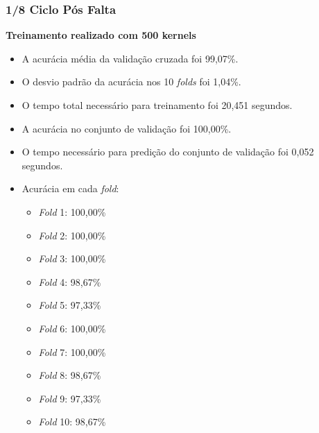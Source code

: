 \subsubsection{1/8 Ciclo Pós Falta}
\textbf{Treinamento realizado com 500 kernels}
\begin{itemize}
    \item A acurácia média da validação cruzada foi 99,07\%.
    \item O desvio padrão da acurácia nos 10 \textit{folds} foi 1,04\%.
    \item O tempo total necessário para treinamento foi 20,451 segundos.
    \item A acurácia no conjunto de validação foi 100,00\%.
    \item O tempo necessário para predição do conjunto de validação foi 0,052 segundos.
    \item Acurácia em cada \textit{fold}:
    \begin{itemize}
        \item \textit{Fold} 1: 100,00\%
        \item \textit{Fold} 2: 100,00\%
        \item \textit{Fold} 3: 100,00\%
        \item \textit{Fold} 4: 98,67\%
        \item \textit{Fold} 5: 97,33\%
        \item \textit{Fold} 6: 100,00\%
        \item \textit{Fold} 7: 100,00\%
        \item \textit{Fold} 8: 98,67\%
        \item \textit{Fold} 9: 97,33\%
        \item \textit{Fold} 10: 98,67\%
    \end{itemize}
\end{itemize}


